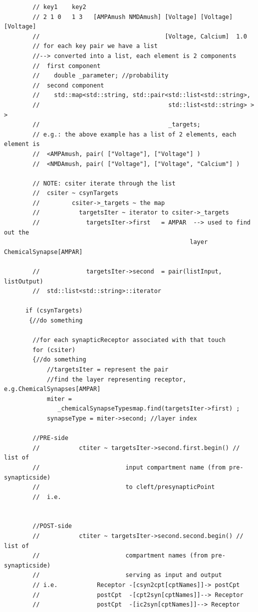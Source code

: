 \begin{verbatim}
        // key1    key2
        // 2 1 0   1 3   [AMPAmush NMDAmush] [Voltage] [Voltage] [Voltage]
        //                                   [Voltage, Calcium]  1.0
        // for each key pair we have a list
        //--> converted into a list, each element is 2 components
        //  first component 
        //    double _parameter; //probability
        //  second component
        //    std::map<std::string, std::pair<std::list<std::string>,
        //                                    std::list<std::string> > >
        //                                    _targets;
        // e.g.: the above example has a list of 2 elements, each element is
        //  <AMPAmush, pair( ["Voltage"], ["Voltage"] )
        //  <NMDAmush, pair( ["Voltage"], ["Voltage", "Calcium"] )
        
        // NOTE: csiter iterate through the list
        //  csiter ~ csynTargets
        //         csiter->_targets ~ the map 
        //           targetsIter ~ iterator to csiter->_targets
        //             targetsIter->first   = AMPAR  --> used to find out the
                                                    layer ChemicalSynapse[AMPAR] 
        
        //             targetsIter->second  = pair(listInput, listOutput)
        //  std::list<std::string>::iterator  
          
      if (csynTargets)
       {//do something
       
        //for each synapticReceptor associated with that touch
        for (csiter)
        {//do something
            //targetsIter = represent the pair
            //find the layer representing receptor, e.g.ChemicalSynapses[AMPAR]
            miter = 
               _chemicalSynapseTypesmap.find(targetsIter->first) ; 
            synapseType = miter->second; //layer index

        //PRE-side
        //           ctiter ~ targetsIter->second.first.begin() // list of 
        //                        input compartment name (from pre-synapticside)
        //                        to cleft/presynapticPoint
        //  i.e. 
              

        //POST-side
        //           ctiter ~ targetsIter->second.second.begin() // list of
        //                        compartment names (from pre-synapticside)
        //                        serving as input and output
        // i.e.           Receptor -[csyn2cpt[cptNames]]-> postCpt
        //                postCpt  -[cpt2syn[cptNames]]--> Receptor
        //                postCpt  -[ic2syn[cptNames]]--> Receptor   


\end{verbatim}
